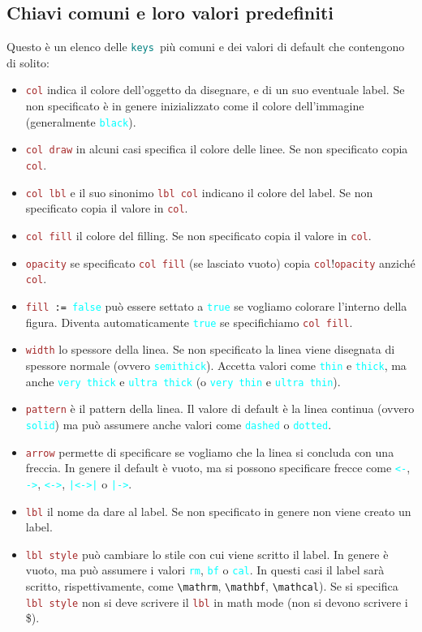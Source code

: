 \documentclass[italian, a4paper]{article}
\newcommand{\bs}{\textbackslash}
\newcommand{\ttt}[1]{\texttt{#1}}
\newcommand{\cyan}[1]{\textcolor{cyan}{#1}}
\newcommand{\keys}{\textcolor{teal}{\ttt{keys}}}
\newcommand{\key}[1]{\textcolor{brown}{\ttt{#1}}}
\newcommand{\keyval}[1]{\cyan{\ttt{#1}}}
\begin{document}
\subsection{Chiavi comuni e loro valori predefiniti}\label{keysec}
Questo è un elenco delle \keys\ più comuni e dei valori di default che contengono di solito:
\begin{itemize}
\item \key{col} indica il colore dell'oggetto da disegnare, e di un suo eventuale label. Se non specificato è in genere inizializzato come il colore dell'immagine (generalmente \keyval{black}).
\item \key{col draw} in alcuni casi specifica il colore delle linee. Se non specificato copia \key{col}.
\item \key{col lbl} e il suo sinonimo \key{lbl col} indicano il colore del label. Se non specificato copia il valore in \key{col}.
\item \key{col fill} il colore del filling. Se non specificato copia il valore in \key{col}.
\item \key{opacity} se specificato \key{col fill} (se lasciato vuoto) copia \key{col}!\key{opacity} anziché \key{col}.
\item \ttt{\key{fill} := \keyval{false}} può essere settato a \keyval{true} se vogliamo colorare l'interno della figura. Diventa automaticamente \keyval{true} se specifichiamo \key{col fill}.
\item \key{width} lo spessore della linea. Se non specificato la linea viene disegnata di spessore normale (ovvero \keyval{semithick}). Accetta valori come \keyval{thin} e \keyval{thick}, ma anche \keyval{very thick} e \keyval{ultra thick} (o \keyval{very thin} e \keyval{ultra thin}).
\item \key{pattern} è il pattern della linea. Il valore di default è la linea continua (ovvero \keyval{solid}) ma può assumere anche valori come \keyval{dashed} o \keyval{dotted}.
\item \key{arrow} permette di specificare se vogliamo che la linea si concluda con una freccia. In genere il default è vuoto, ma si possono specificare frecce come \keyval{<-}, \keyval{->}, \keyval{<->}, \keyval{|<->|} o \keyval{|->}.
\item \key{lbl} il nome da dare al label. Se non specificato in genere non viene creato un label.
\item \key{lbl style} può cambiare lo stile con cui viene scritto il label. In genere è vuoto, ma può assumere i valori \keyval{rm}, \keyval{bf} o \keyval{cal}. In questi casi il label sarà scritto, rispettivamente, come \ttt{\bs mathrm}, \ttt{\bs mathbf}, \ttt{\bs mathcal}). Se si specifica \key{lbl style} non si deve scrivere il \key{lbl} in math mode (non si devono scrivere i \$).

\end{itemize}
\end{document}
